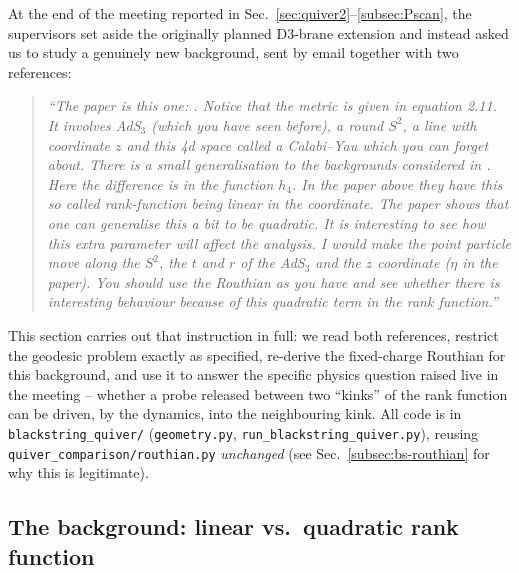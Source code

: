 \documentclass[11pt]{article}
\begin{document}
At the end of the meeting reported in Sec.~\ref{sec:quiver2}--\ref{subsec:Pscan}, the supervisors set aside the originally planned D3-brane extension and instead asked us to study a genuinely new background, sent by email together with two references:
\begin{quote}
\emph{``The paper is this one: \cite{Couzens:2021tnq}. Notice that the metric is given in equation 2.11. It involves AdS$_3$ (which you have seen before), a round $S^2$, a line with coordinate $z$ and this 4d space called a Calabi--Yau which you can forget about. There is a small generalisation to the backgrounds considered in \cite{Fatemiabhari:2025qcg}. Here the difference is in the function $h_4$. In the \cite{Fatemiabhari:2025qcg} paper above they have this so called rank-function being linear in the coordinate. The paper \cite{Couzens:2021tnq} shows that one can generalise this a bit to be quadratic. It is interesting to see how this extra parameter will affect the analysis. I would make the point particle move along the $S^2$, the $t$ and $r$ of the AdS$_3$ and the $z$ coordinate ($\eta$ in the \cite{Fatemiabhari:2025qcg} paper). You should use the Routhian as you have and see whether there is interesting behaviour because of this quadratic term in the rank function.''}
\end{quote}
This section carries out that instruction in full: we read both references, restrict the geodesic problem exactly as specified, re-derive the fixed-charge Routhian for this background, and use it to answer the specific physics question raised live in the meeting -- whether a probe released between two ``kinks'' of the rank function can be driven, by the dynamics, into the neighbouring kink. All code is in \texttt{blackstring\_quiver/} (\texttt{geometry.py}, \texttt{run\_blackstring\_quiver.py}), reusing \texttt{quiver\_comparison/routhian.py} \emph{unchanged} (see Sec.~\ref{subsec:bs-routhian} for why this is legitimate).

\subsection{The background: linear vs.\ quadratic rank function}
\label{subsec:bs-background}
\end{document}
